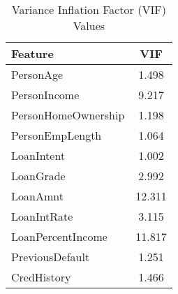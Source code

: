 \begin{table}[H]\centering
\caption{Variance Inflation Factor (VIF) Values}
\label{Table 4:vif_values}
\begin{tabular}{lc}
\toprule
Feature & VIF \\
\midrule
PersonAge & 1.498 \\
PersonIncome & 9.217 \\
PersonHomeOwnership & 1.198 \\
PersonEmpLength & 1.064 \\
LoanIntent & 1.002 \\
LoanGrade & 2.992 \\
LoanAmnt & 12.311 \\
LoanIntRate & 3.115 \\
LoanPercentIncome & 11.817 \\
PreviousDefault & 1.251 \\
CredHistory & 1.466 \\
\bottomrule
\end{tabular}
\end{table}
